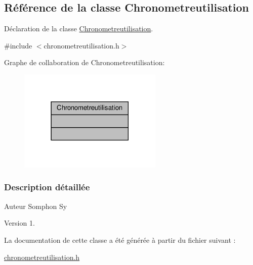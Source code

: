 \hypertarget{class_chronometreutilisation}{}\subsection{Référence de la classe Chronometreutilisation}
\label{class_chronometreutilisation}


Déclaration de la classe \hyperlink{class_chronometreutilisation}{Chronometreutilisation}.  




{\ttfamily \#include $<$chronometreutilisation.\+h$>$}



Graphe de collaboration de Chronometreutilisation\+:\nopagebreak
\begin{figure}[H]
\begin{center}
\leavevmode
\includegraphics[width=194pt]{class_chronometreutilisation__coll__graph}
\end{center}
\end{figure}


\subsubsection{Description détaillée}
\begin{DoxyAuthor}{Auteur}
Somphon Sy
\end{DoxyAuthor}
\begin{DoxyVersion}{Version}
1. 
\end{DoxyVersion}


La documentation de cette classe a été générée à partir du fichier suivant \+:\begin{DoxyCompactItemize}
\item 
\hyperlink{chronometreutilisation_8h}{chronometreutilisation.\+h}\end{DoxyCompactItemize}
